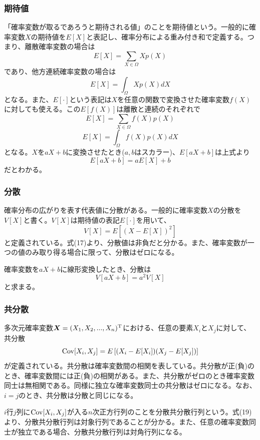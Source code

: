 \documentclass[dvipdfmx, 9pt, a4paper]{jsarticle}
\newcommand{\bm}[1]{{\mbox{\boldmath $#1$}}}
\begin{document}
\subsubsection{期待値}
「確率変数が取るであろうと期待される値」のことを期待値という。一般的に確率変数$X$の期待値を$E[X]$と表記し、確率分布による重み付き和で定義する。つまり、離散確率変数の場合は
\begin{equation}
E[X]=\sum_{X \in \Omega} Xp(X)
\end{equation}
であり、他方連続確率変数の場合は
\begin{equation}
E[X]=\int_\Omega Xp(X)dX
\end{equation}
となる。また、$E[\cdot]$という表記は$X$を任意の関数で変換させた確率変数$f(X)$に対しても使える。この$E[f(X)]$は離散と連続のそれぞれで
\begin{equation}
E[X]=\sum_{X \in \Omega} f(X)p(X)
\end{equation}
\begin{equation}
E[X]=\int_\Omega f(X)p(X)dX
\end{equation}
となる。$X$を$aX+b$に変換させたとき($a, b$はスカラー)、$E[aX+b]$は上式より
\begin{equation}
E[aX+b]=aE[X]+b
\end{equation}
だとわかる。

\subsubsection{分散}
確率分布の広がりを表す代表値に分散がある。一般的に確率変数$X$の分散を$V[X]$と書く。$V[X]$は期待値の表記$E[\cdot]$を用いて、
\begin{equation}
V[X]=E\left[ (X-E[X])^2 \right]
\end{equation}
と定義されている。式(17)より、分散値は非負だと分かる。また、確率変数が一つの値のみ取り得る場合に限って、分散はゼロになる。\par
確率変数を$aX+b$に線形変換したとき、分散は
\begin{equation}
V[aX+b]=a^2V[X]
\end{equation}
と求まる。

\subsubsection{共分散}
多次元確率変数$\bm X=(X_1, X_2, ..., X_n)^{\rm T}$における、任意の要素$X_i$と$X_j$に対して、共分散
\begin{equation}
{\rm Cov}[X_i, X_j]=E\left[ (X_i-E[X_i])(X_j-E[X_j]) \right]
\end{equation}
が定義されている。共分散は確率変数間の相関を表している。共分散が正(負)のとき、確率変数間には正(負)の相関がある。また、共分散がゼロのとき確率変数同士は無相関である。同様に独立な確率変数同士の共分散はゼロになる。なお、$i=j$のとき、共分散は分散と同じになる。\par
$i$行$j$列に${\rm Cov}[X_i, X_j]$が入る$n$次正方行列のことを分散共分散行列という。式(19)より、分散共分散行列は対象行列であることが分かる。また、任意の確率変数同士が独立である場合、分散共分散行列は対角行列になる。
\end{document}
